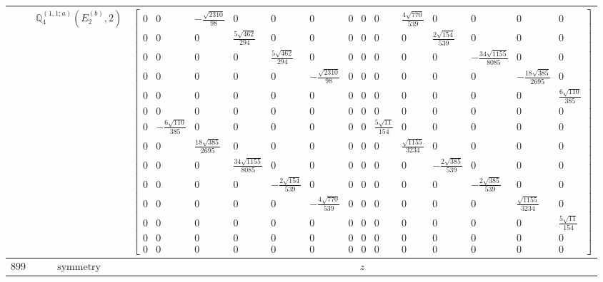 \documentclass[fleqn,8pt,landscape]{jsarticle}
\begin{document}
\begin{longtable}{ccc}
$  $ & $ \mathbb{Q}_{4}^{(1,1;a)}(E_{2}^{(b)},2) $ & $ \begin{bmatrix} 0 & 0 & - \frac{\sqrt{2310}}{98} & 0 & 0 & 0 & 0 & 0 & 0 & \frac{4 \sqrt{770}}{539} & 0 & 0 & 0 & 0 \\ 0 & 0 & 0 & \frac{5 \sqrt{462}}{294} & 0 & 0 & 0 & 0 & 0 & 0 & \frac{2 \sqrt{154}}{539} & 0 & 0 & 0 \\ 0 & 0 & 0 & 0 & \frac{5 \sqrt{462}}{294} & 0 & 0 & 0 & 0 & 0 & 0 & - \frac{34 \sqrt{1155}}{8085} & 0 & 0 \\ 0 & 0 & 0 & 0 & 0 & - \frac{\sqrt{2310}}{98} & 0 & 0 & 0 & 0 & 0 & 0 & - \frac{18 \sqrt{385}}{2695} & 0 \\ 0 & 0 & 0 & 0 & 0 & 0 & 0 & 0 & 0 & 0 & 0 & 0 & 0 & \frac{6 \sqrt{110}}{385} \\ 0 & 0 & 0 & 0 & 0 & 0 & 0 & 0 & 0 & 0 & 0 & 0 & 0 & 0 \\ 0 & - \frac{6 \sqrt{110}}{385} & 0 & 0 & 0 & 0 & 0 & 0 & \frac{5 \sqrt{11}}{154} & 0 & 0 & 0 & 0 & 0 \\ 0 & 0 & \frac{18 \sqrt{385}}{2695} & 0 & 0 & 0 & 0 & 0 & 0 & \frac{\sqrt{1155}}{3234} & 0 & 0 & 0 & 0 \\ 0 & 0 & 0 & \frac{34 \sqrt{1155}}{8085} & 0 & 0 & 0 & 0 & 0 & 0 & - \frac{2 \sqrt{385}}{539} & 0 & 0 & 0 \\ 0 & 0 & 0 & 0 & - \frac{2 \sqrt{154}}{539} & 0 & 0 & 0 & 0 & 0 & 0 & - \frac{2 \sqrt{385}}{539} & 0 & 0 \\ 0 & 0 & 0 & 0 & 0 & - \frac{4 \sqrt{770}}{539} & 0 & 0 & 0 & 0 & 0 & 0 & \frac{\sqrt{1155}}{3234} & 0 \\ 0 & 0 & 0 & 0 & 0 & 0 & 0 & 0 & 0 & 0 & 0 & 0 & 0 & \frac{5 \sqrt{11}}{154} \\ 0 & 0 & 0 & 0 & 0 & 0 & 0 & 0 & 0 & 0 & 0 & 0 & 0 & 0 \\ 0 & 0 & 0 & 0 & 0 & 0 & 0 & 0 & 0 & 0 & 0 & 0 & 0 & 0 \end{bmatrix} $ \\ \hline
$ 899 $ & $ \text{symmetry} $ & $ z $ \\

\end{longtable}
\end{document}
